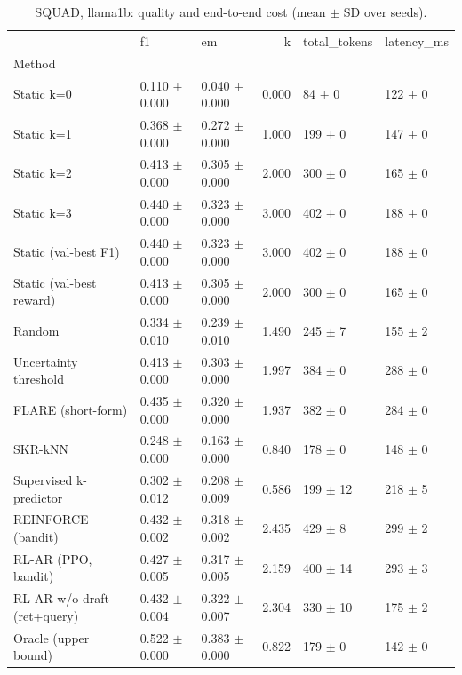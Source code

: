 \begin{table}
\caption{SQUAD, llama1b: quality and end-to-end cost (mean $\pm$ SD over seeds).}
\begin{tabular}{lllrll}
\toprule
 & f1 & em & k & total_tokens & latency_ms \\
Method &  &  &  &  &  \\
\midrule
Static k=0 & 0.110 $\pm$ 0.000 & 0.040 $\pm$ 0.000 & 0.000 & 84 $\pm$ 0 & 122 $\pm$ 0 \\
Static k=1 & 0.368 $\pm$ 0.000 & 0.272 $\pm$ 0.000 & 1.000 & 199 $\pm$ 0 & 147 $\pm$ 0 \\
Static k=2 & 0.413 $\pm$ 0.000 & 0.305 $\pm$ 0.000 & 2.000 & 300 $\pm$ 0 & 165 $\pm$ 0 \\
Static k=3 & 0.440 $\pm$ 0.000 & 0.323 $\pm$ 0.000 & 3.000 & 402 $\pm$ 0 & 188 $\pm$ 0 \\
Static (val-best F1) & 0.440 $\pm$ 0.000 & 0.323 $\pm$ 0.000 & 3.000 & 402 $\pm$ 0 & 188 $\pm$ 0 \\
Static (val-best reward) & 0.413 $\pm$ 0.000 & 0.305 $\pm$ 0.000 & 2.000 & 300 $\pm$ 0 & 165 $\pm$ 0 \\
Random & 0.334 $\pm$ 0.010 & 0.239 $\pm$ 0.010 & 1.490 & 245 $\pm$ 7 & 155 $\pm$ 2 \\
Uncertainty threshold & 0.413 $\pm$ 0.000 & 0.303 $\pm$ 0.000 & 1.997 & 384 $\pm$ 0 & 288 $\pm$ 0 \\
FLARE (short-form) & 0.435 $\pm$ 0.000 & 0.320 $\pm$ 0.000 & 1.937 & 382 $\pm$ 0 & 284 $\pm$ 0 \\
SKR-kNN & 0.248 $\pm$ 0.000 & 0.163 $\pm$ 0.000 & 0.840 & 178 $\pm$ 0 & 148 $\pm$ 0 \\
Supervised k-predictor & 0.302 $\pm$ 0.012 & 0.208 $\pm$ 0.009 & 0.586 & 199 $\pm$ 12 & 218 $\pm$ 5 \\
REINFORCE (bandit) & 0.432 $\pm$ 0.002 & 0.318 $\pm$ 0.002 & 2.435 & 429 $\pm$ 8 & 299 $\pm$ 2 \\
RL-AR (PPO, bandit) & 0.427 $\pm$ 0.005 & 0.317 $\pm$ 0.005 & 2.159 & 400 $\pm$ 14 & 293 $\pm$ 3 \\
RL-AR w/o draft (ret+query) & 0.432 $\pm$ 0.004 & 0.322 $\pm$ 0.007 & 2.304 & 330 $\pm$ 10 & 175 $\pm$ 2 \\
Oracle (upper bound) & 0.522 $\pm$ 0.000 & 0.383 $\pm$ 0.000 & 0.822 & 179 $\pm$ 0 & 142 $\pm$ 0 \\
\bottomrule
\end{tabular}
\end{table}
